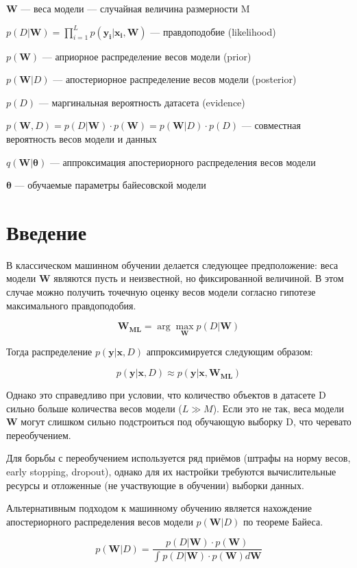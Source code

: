\documentclass{article}
\newcommand{\argmax}{\arg\!\max}
\begin{document}
$\pmb{W}$ --- веса модели --- случайная величина размерности M

$p(D | \pmb{W}) = \prod_{i=1}^{L} p(\pmb{y_i} | \pmb{x_i}, \pmb{W})$ — правдоподобие (likelihood)

$p(\pmb{W})$ --- априорное распределение весов модели (prior)

$p(\pmb{W}| D)$ --- апостериорное распределение весов модели (posterior)

$p(D)$ --- маргинальная вероятность датасета (evidence)

$
p(\pmb{W}, D) =
p(D | \pmb{W}) \cdot p(\pmb{W}) =
p(\pmb{W}| D)\cdot p(D)
$ --- совместная вероятность весов модели и данных

$q(\pmb{W} | \pmb{\theta})$ --- аппроксимация апостериорного распределения весов модели

$\pmb{\theta}$ --- обучаемые параметры байесовской модели

\section{Введение}

В классическом машинном обучении делается следующее предположение: веса модели $\pmb{W}$ являются пусть и неизвестной, но фиксированной величиной. В этом случае можно получить точечную оценку весов модели согласно гипотезе максимального правдоподобия.

\[
\pmb{W_{ML}} = \argmax_{\pmb{W}} p(D | \pmb{W})
\]

Тогда распределение $p(\pmb{y} | \pmb{x}, D)$ аппроксимируется следующим образом:

\[
p(\pmb{y} | \pmb{x}, D) \approx p(\pmb{y} | \pmb{x}, \pmb{W_{ML}})
\]

Однако это справедливо при условии, что количество объектов в датасете D сильно больше количества весов модели ($L \gg M$). Если это не так, веса модели $\pmb{W}$ могут слишком сильно подстроиться под обучающую выборку D, что черевато переобучением.

Для борьбы с переобучением используется ряд приёмов (штрафы на норму весов, early stopping, dropout), однако для их настройки требуются вычислительные ресурсы и отложенные (не участвующие в обучении) выборки данных.

Альтернативным подходом к машинному обучению является нахождение апостериорного распределения весов модели $p(\pmb{W}| D)$ по теореме Байеса.

\[
p(\pmb{W}| D) =
\dfrac{p(D | \pmb{W}) \cdot p(\pmb{W})}{\int_{}{} p(D | \pmb{W}) \cdot p(\pmb{W}) d \pmb{W}}
\]
\end{document}
